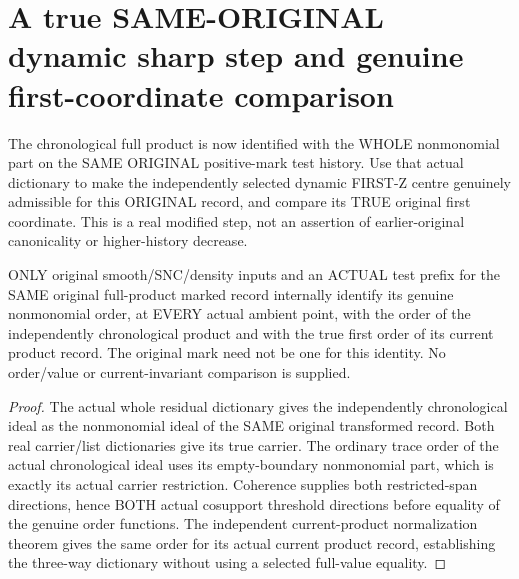 \section{A true SAME-ORIGINAL dynamic sharp step and genuine first-coordinate comparison}

The chronological full product is now identified with the WHOLE
nonmonomial part on the SAME ORIGINAL positive-mark test history. Use that
actual dictionary to make the independently selected dynamic FIRST-Z
centre genuinely admissible for this ORIGINAL record, and compare its
TRUE original first coordinate. This is a real modified step, not an
assertion of earlier-original canonicality or higher-history decrease.

\begin{lemma}
\label{hir:sharp-actual-original-controlled-history-current-first-order}
\leanok
ONLY original smooth/SNC/density inputs and an ACTUAL test prefix for the
SAME original full-product marked record internally identify its genuine
nonmonomial order, at EVERY actual ambient point, with the order of the
independently chronological product and with the true first order of its
current product record. The original mark need not be one for this
identity. No order/value or current-invariant comparison is supplied.
\end{lemma}
\begin{proof}
The actual whole residual dictionary gives the independently chronological
ideal as the nonmonomial ideal of the SAME original transformed record.
Both real carrier/list dictionaries give its true carrier. The ordinary
trace order of the actual chronological ideal uses its empty-boundary
nonmonomial part, which is exactly its actual carrier restriction.
Coherence supplies both restricted-span directions, hence BOTH actual
cosupport threshold directions before equality of the genuine order
functions. The independent current-product normalization theorem gives
the same order for its actual current product record, establishing the
three-way dictionary without using a selected full-value equality.
\end{proof}

